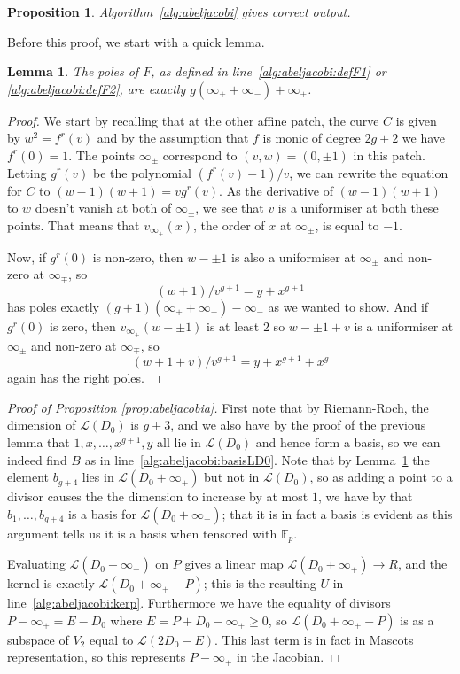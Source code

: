 \documentclass{article}
\newcommand{\Lcal}{\mathcal{L}}
\newcommand{\F}{\mathbb{F}}
\theoremstyle{plain}
\newtheorem{lem}[thm]{Lemma} %
\newtheorem{prop}[thm]{Proposition} %
\theoremstyle{definition}
\theoremstyle{remark}
\begin{document}
\begin{prop}
\label{prop:abeljacobi}
Algorithm~\ref{alg:abeljacobi} gives correct output.
\end{prop}
Before this proof, we start with a quick lemma.
\begin{lem}
\label{lem:poles2d0i+}
The poles of $F$, as defined in line~\ref{alg:abeljacobi:defF1} or \ref{alg:abeljacobi:defF2}, are exactly $g(\infty_+ + \infty_-) + \infty_+$. 
\end{lem}
\begin{proof}
We start by recalling that at the other affine patch, the curve $C$ is given by $w^2 = f^r(v)$ and by the assumption that $f$ is monic of degree $2g+2$ we have $f^r(0) = 1$. The points $\infty_\pm$ correspond to $(v,w) = (0,\pm 1)$ in this patch. Letting $g^r(v)$ be the polynomial $(f^r(v)-1)/v$, we can rewrite the equation for $C$ to $(w-1)(w+1) = vg^r(v)$. As the derivative of $(w-1)(w+1)$ to $w$ doesn't vanish at both of $\infty_\pm$, we see that $v$ is a uniformiser at both these points. That means that $v_{\infty_\pm}(x)$, the order of $x$ at $\infty_\pm$, is equal to $-1$.

Now, if $g^r(0)$ is non-zero, then $w- \pm 1$ is also a uniformiser at $\infty_\pm$ and non-zero at $\infty_\mp$, so \[(w+1)/v^{g+1} = y + x^{g+1}\] has poles exactly $(g+1)(\infty_+ + \infty_-) - \infty_-$ as we wanted to show.
And if $g^r(0)$ is zero, then $v_{\infty_\pm}(w-\pm1)$ is at least $2$ so $w-\pm 1 + v$ is a uniformiser at $\infty_\pm$ and non-zero at $\infty_\mp$, so \[(w+1+v)/v^{g+1} = y + x^{g+1} + x^{g}\] again has the right poles.
\end{proof}


\begin{proof}[Proof of Proposition \ref{prop:abeljacobia}]
First note that by Riemann-Roch, the dimension of $\Lcal(D_0)$ is $g + 3$, and we also have by the proof of the previous lemma that $1,x,\dots,x^{g+1},y$ all lie in $\Lcal(D_0)$ and hence form a basis, so we can indeed find $B$ as in line~\ref{alg:abeljacobi:basisLD0}. Note that by Lemma~\ref{lem:poles2d0i+} the element $b_{g+4}$ lies in $\Lcal(D_0 + \infty_+)$ but not in $\Lcal(D_0)$, so as adding a point to a divisor causes the the dimension to increase by at most $1$, we have by that $b_1,\dots,b_{g+4}$ is a basis for $\Lcal(D_0 + \infty_+)$; that it is in fact a basis is evident as this argument tells us it is a basis when tensored with $\F_p$.

Evaluating $\Lcal(D_0 + \infty_+)$ on $P$ gives a linear map $\Lcal(D_0 + \infty_+) \to R$, and the kernel is exactly $\Lcal(D_0 + \infty_+ - P)$; this is the resulting $U$ in line~\ref{alg:abeljacobi:kerp}. Furthermore we have the equality of divisors $P-\infty_+ = E - D_0$ where $E = P + D_0 - \infty_+ \geq 0$, so $\Lcal(D_0 + \infty_+ - P)$ is as a subspace of $V_2$ equal to $\Lcal(2D_0 - E)$. This last term is in fact in Mascots representation, so this represents $P-\infty_+$ in the Jacobian.
\end{proof}
\end{document}
